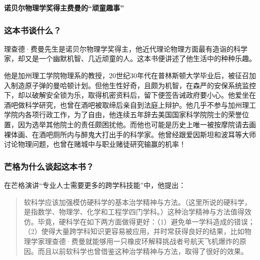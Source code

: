 \cleardoublepage
{}


\begin{BookSummaryBox}
\textbf{诺贝尔物理学奖得主费曼的“顽童趣事”}
\par
\end{BookSummaryBox}

\subsubsection*{这本书谈什么？}

理查德·费曼先生是诺贝尔物理学奖得主，他近代理论物理方面最有造诣的科学家，却又是一个幽默机智、几近顽童的人。这本书便讲述了他生活中的种种乐趣。
\par

他是加州理工学院物理系的教授，20世纪30年代在普林斯顿大学毕业后，被征召加入制造原子弹的曼哈顿计划。但他生性好奇，且颇为机智，在森严的安保系统监控下，却以破解安全锁为乐，取得机密资料后，留下便签告诫政府要小心。他爱坐在酒吧做科学研究，也曾在酒吧被取缔后亲自到法庭上辩护。他几乎不参与加州理工学院内各项行政工作，为了自由，他连续五年辞去美国国家科学院院士的荣誉位置，因为选举其他院士的责任颇困扰他。而他也可能是历史上唯一被按摩院请去画裸体画、在酒吧厕所内与醉鬼大打出手的科学家。他曾经跟爱因斯坦和波耳等大师讨论物理问题，也曾在赌城中与职业赌徒研究输赢的机率！
\par

\subsubsection*{芒格为什么谈起这本书？}

在芒格演讲“专业人士需要更多的跨学科技能”中，他提出：
\par

\begin{quotation}
软科学应该加强模仿硬科学的基本治学精神与方法。（这里所说的硬科学，是指数学、物理学、化学和工程学四门学科。）这种治学精神与方法值得效仿。毕竟，硬科学在如下两方面做得更好：（1）避免单一学科造成的错误；（2）使得大量跨学科知识更容易被应用，并时常获得良好的结果，比如物理学家理查德·费曼就能够用一只橡皮环解释挑战者号航天飞机爆炸的原因。而且以前软科学也曾借鉴这种治学精神与方法，取得了很好的效果。
\par
\end{quotation}

